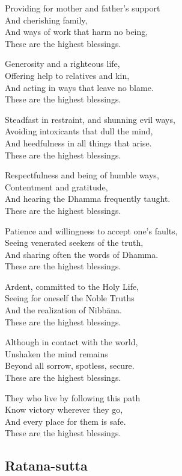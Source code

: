 Providing for mother and father's support\\
And cherishing family,\\
And ways of work that harm no being,\\
These are the highest blessings.

Generosity and a righteous life,\\
Offering help to relatives and kin,\\
And acting in ways that leave no blame.\\
These are the highest blessings.

Steadfast in restraint, and shunning evil ways,\\
Avoiding intoxicants that dull the mind,\\
And heedfulness in all things that arise.\\
These are the highest blessings.

Respectfulness and being of humble ways,\\
Contentment and gratitude,\\
And hearing the Dhamma frequently taught.\\
These are the highest blessings.

Patience and willingness to accept one's faults,\\
Seeing venerated seekers of the truth,\\
And sharing often the words of Dhamma.\\
These are the highest blessings.

Ardent, committed to the Holy Life,\\
Seeing for oneself the Noble Truths\\
And the realization of Nibbāna.\\
These are the highest blessings.

Although in contact with the world,\\
Unshaken the mind remains\\
Beyond all sorrow, spotless, secure.\\
These are the highest blessings.

They who live by following this path\\
Know victory wherever they go,\\
And every place for them is safe.\\
These are the highest blessings.


\clearpage

\subsection{Ratana-sutta}

